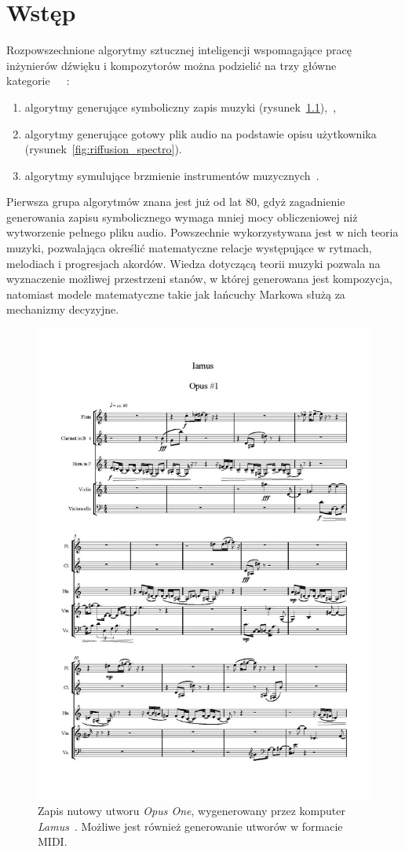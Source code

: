 \chapter{Wstęp}

Rozpowszechnione algorytmy sztucznej inteligencji wspomagające pracę inżynierów dźwięku i kompozytorów
można podzielić na trzy główne kategorie~\cite{ji2020comprehensive}~\cite{analysis_generative}~\label{traditional_algos}:

\begin{enumerate}
    \item algorytmy generujące symboliczny zapis muzyki (rysunek~\ref{fig:lamus_notes}),~\cite{zhang2023language},
    \item algorytmy generujące gotowy plik audio na podstawie opisu użytkownika (rysunek~\ref{fig:riffusion_spectro}).
    \item algorytmy symulujące brzmienie instrumentów muzycznych~\cite{engel2017neural}.
\end{enumerate}

Pierwsza grupa algorytmów znana jest już od lat 80, gdyż zagadnienie generowania zapisu symbolicznego wymaga mniej mocy obliczeniowej niż wytworzenie pełnego pliku audio.
Powszechnie wykorzystywana jest w nich teoria muzyki, pozwalająca określić matematyczne relacje występujące w rytmach, melodiach i progresjach akordów.
Wiedza dotyczącą teorii muzyki pozwala na wyznaczenie możliwej przestrzeni stanów, w której generowana jest kompozycja,
natomiast modele matematyczne takie jak łańcuchy Markowa służą za mechanizmy decyzyjne.

\begin{figure}[H]
    \centering
    \includegraphics[width=0.4\linewidth]{rys01/lamus_notes.jpg}
    \caption{
      Zapis nutowy utworu \textit{Opus One},
      wygenerowany przez komputer \textit{Lamus}~\cite{lamus}.
      Możliwe jest również generowanie utworów w formacie MIDI\@.
    }\label{fig:lamus_notes}
\end{figure}

